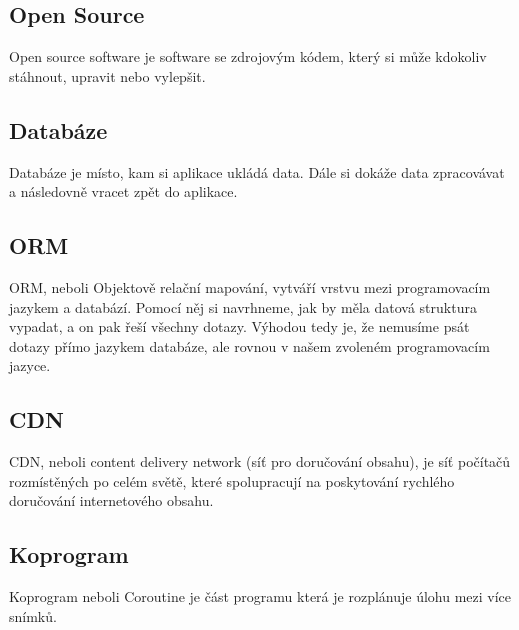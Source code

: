 \subsection{Open Source}
Open source software je software se zdrojovým kódem, který si může kdokoliv stáhnout, upravit nebo vylepšit. \cite{OpenSource}

\subsection{Databáze}
Databáze je místo, kam si aplikace ukládá data. Dále si dokáže data zpracovávat a následovně vracet zpět do aplikace.

\subsection{ORM}
ORM, neboli Objektově relační mapování, vytváří vrstvu mezi programovacím jazykem a databází. Pomocí něj si navrhneme, jak by měla datová struktura vypadat, a on pak řeší všechny dotazy. Výhodou tedy je, že nemusíme psát dotazy přímo jazykem databáze, ale rovnou v našem zvoleném programovacím jazyce.

\subsection{CDN}
CDN, neboli content delivery network (síť pro doručování obsahu), je síť počítačů rozmístěných po celém světě, které spolupracují na poskytování rychlého doručování internetového obsahu.\cite{CDN}

\subsection{Koprogram}
Koprogram neboli Coroutine je část programu která je rozplánuje úlohu mezi více snímků.\cite{Coroutine} 
